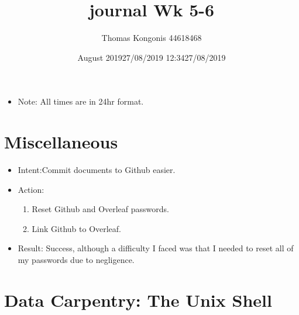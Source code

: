 \documentclass{article}
\title{journal Wk 5-6}
\author{Thomas Kongonis 44618468 }
\date{August 2019}
\begin{document}
\maketitle

\tableofcontents
\vspace{5mm}
\begin{itemize}
\item{Note: All times are in 24hr format.}
\end{itemize}

\section{Miscellaneous}

\date{27/08/2019 12:34}
\begin{itemize}
\item{Intent:Commit documents to Github easier.}


\item{Action:}
\begin{enumerate}
    \item{Reset Github and Overleaf passwords.}
    \item{Link Github to Overleaf.}
\end{enumerate}

\item{Result: Success, although a difficulty I faced was that I needed to reset all of my passwords due to negligence.}
\end{itemize}
\vspace{5mm}

\section{Data Carpentry: The Unix Shell}
\date{27/08/2019}
\end{document}
